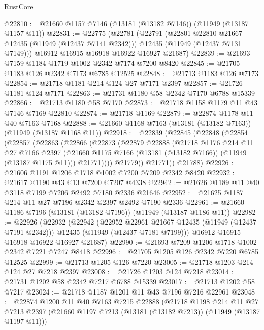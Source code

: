 \begin{lexlean}{RustCore}
\begin{coremodule}
@22810 := @21660 @1157 @7146 (@13181 (@13182 @7146)) (@11949 (@13187 @1157 @11))
@22831 := @22775
    (@22781
      (@22791
        (@22801 @22810 @21667 @12435 (@11949 (@12437 @7141 @2342)))
        @12435
        (@11949 (@12437 @7131 @7149)))
      @16912
      @16915
      @16918
      @16922
      @16927
      @21687)
@22839 := @21693 @7159 @1184 @1719 @1002 @2342 @7174 @7200 @8420
@22845 := @21705 @1183 @126 @2342 @7173 @6785 @12525
@22848 := @21713 @1183 @126 @7173
@22854 := @21718 @1181 @214 @124 @27 @7171 @2397
@22857 := @21726 @1181 @124 @7171
@22863 := @21731 @1180 @58 @2342 @7170 @6788 @15339
@22866 := @21713 @1180 @58 @7170
@22873 := @21718 @1158 @1179 @11 @43 @7146 @7169 @22810
@22874 := @21718 @1169
@22879 := @22874 @1178 @11 @40 @7163 @7168
@22888 := @21660 @1168 @7163 (@13181 (@13182 @7163)) (@11949 (@13187 @1168 @11))
@22918 := @22839
    (@22845
      (@22848
        (@22854
          (@22857
            (@22863
              (@22866
                (@22873
                  (@22879
                    @22888
                    (@21718
                      @1176
                      @214
                      @11
                      @27
                      @7166
                      @2397
                      (@21660 @1175 @7166 (@13181 (@13182 @7166)) (@11949 (@13187 @1175 @11)))
                      @21771))))
              @21779))
          @21771))
      @21788)
@22926 := @21606 @1191 @1206 @1718 @1002 @7200 @7209 @2342 @8420
@22932 := @21617 @1190 @43 @13 @7200 @7207 @4338
@22942 := @21626 @1189 @11 @40 @3118 @7199 @7206 @2492 @7180 @2336 @21646
@22952 := @21625 @1187 @214 @11 @27 @7196 @2342 @2397 @2492 @7190 @2336
@22961 := @21660 @1186 @7196 (@13181 (@13182 @7196)) (@11949 (@13187 @1186 @11))
@22982 := @22926
    (@22932
      (@22942
        (@22952 @22961 @21667 @12435 (@11949 (@12437 @7191 @2342)))
        @12435
        (@11949 (@12437 @7181 @7199)))
      @16912
      @16915
      @16918
      @16922
      @16927
      @21687)
@22990 := @21693 @7209 @1206 @1718 @1002 @2342 @7221 @7247 @8418
@22996 := @21705 @1205 @126 @2342 @7220 @6785 @12525
@22999 := @21713 @1205 @126 @7220
@23005 := @21718 @1203 @214 @124 @27 @7218 @2397
@23008 := @21726 @1203 @124 @7218
@23014 := @21731 @1202 @58 @2342 @7217 @6788 @15339
@23017 := @21713 @1202 @58 @7217
@23024 := @21718 @1187 @1201 @11 @43 @7196 @7216 @22961
@23048 := @22874
    @1200
    @11
    @40
    @7163
    @7215
    @22888
    (@21718
      @1198
      @214
      @11
      @27
      @7213
      @2397
      (@21660 @1197 @7213 (@13181 (@13182 @7213)) (@11949 (@13187 @1197 @11)))

\end{coremodule}
\end{lexlean}
